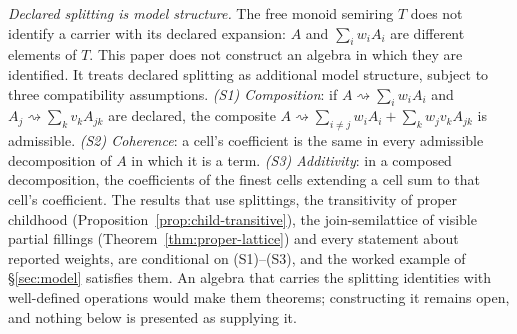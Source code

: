 \textit{Declared splitting is model structure.} The free monoid semiring $T$ does not identify a carrier with its declared expansion: $A$ and $\sum_i w_i A_i$ are different elements of $T$. This paper does not construct an algebra in which they are identified. It treats declared splitting as additional model structure, subject to three compatibility assumptions. \emph{(S1) Composition}: if $A \rightsquigarrow \sum_i w_i A_i$ and $A_j \rightsquigarrow \sum_k v_k A_{jk}$ are declared, the composite $A \rightsquigarrow \sum_{i \ne j} w_i A_i + \sum_k w_j v_k A_{jk}$ is admissible. \emph{(S2) Coherence}: a cell's coefficient is the same in every admissible decomposition of $A$ in which it is a term. \emph{(S3) Additivity}: in a composed decomposition, the coefficients of the finest cells extending a cell sum to that cell's coefficient. The results that use splittings, the transitivity of proper childhood (Proposition~\ref{prop:child-transitive}), the join-semilattice of visible partial fillings (Theorem~\ref{thm:proper-lattice}) and every statement about reported weights, are conditional on (S1)--(S3), and the worked example of \S\ref{sec:model} satisfies them. An algebra that carries the splitting identities with well-defined operations would make them theorems; constructing it remains open, and nothing below is presented as supplying it.
